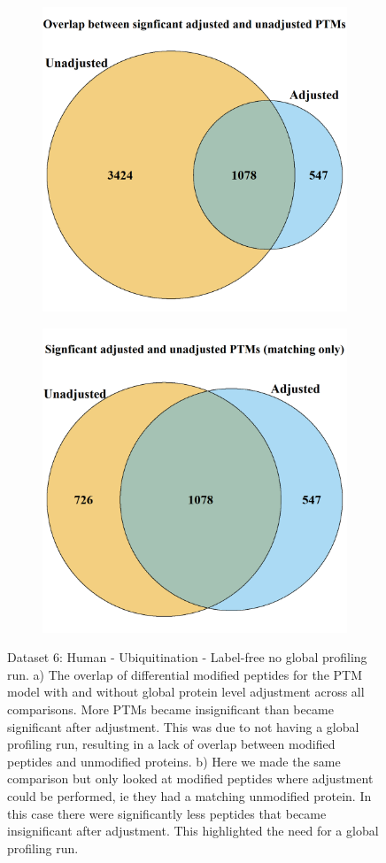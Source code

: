 \documentclass[mcp]{article}
\numberwithin{table}{section}
\begin{document}
\begin{figure}[h!]
\centering
 \begin{subfigure}{\textwidth}
 \centering
	\includegraphics[height=.525\textwidth]{images/usp30_venn_diagramm}
	\caption{}
	\label{fig:data6_vd1}
 \end{subfigure}
 \begin{subfigure}{\textwidth}
 \centering
	\includegraphics[height=.525\textwidth]{images/usp30_venn_diagramm_matching_only}
	\caption{}
	\label{fig:data6_vd2}
 \end{subfigure}
 \caption{Dataset 6: Human - Ubiquitination - Label-free no global profiling run. a) The overlap of differential modified peptides for the PTM model with and without global protein level adjustment across all comparisons. More PTMs became insignificant than became significant after adjustment. This was due to not having a global profiling run, resulting in a lack of overlap between modified peptides and unmodified proteins. b) Here we made the same comparison but only looked at modified peptides where adjustment could be performed, ie they had a matching unmodified protein. In this case there were significantly less peptides that became insignificant after adjustment. This highlighted the need for a global profiling run.}
\label{fig:data6_plots}
\end{figure}
\end{document}
